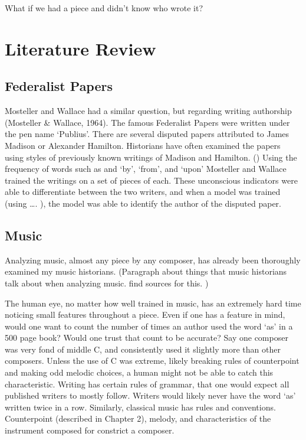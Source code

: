 \documentclass[12pt,twoside]{reedthesis}
\theoremstyle{definition}
\theoremstyle{definition}
\theoremstyle{definition}
\theoremstyle{remark}
\begin{document}
What if we had a piece and didn't know who wrote it?

\section{Literature Review}\label{literature-review}

\subsection{Federalist Papers}\label{federalist-papers}

Mosteller and Wallace had a similar question, but regarding writing
authorship (Mosteller \& Wallace, 1964). The famous Federalist Papers
were written under the pen name `Publius'. There are several disputed
papers attributed to James Madison or Alexander Hamilton. Historians
have often examined the papers using styles of previously known writings
of Madison and Hamilton. () Using the frequency of words such as and
`by', `from', and `upon' Mosteller and Wallace trained the writings on a
set of pieces of each. These unconscious indicators were able to
differentiate between the two writers, and when a model was trained
(using \ldots{}. ), the model was able to identify the author of the
disputed paper.

\subsection{Music}\label{music}

Analyzing music, almost any piece by any composer, has already been
thoroughly examined my music historians. (Paragraph about things that
music historians talk about when analyzing music. find sources for this.
)

The human eye, no matter how well trained in music, has an extremely
hard time noticing small features throughout a piece. Even if one has a
feature in mind, would one want to count the number of times an author
used the word `as' in a 500 page book? Would one trust that count to be
accurate? Say one composer was very fond of middle C, and consistently
used it slightly more than other composers. Unless the use of C was
extreme, likely breaking rules of counterpoint and making odd melodic
choices, a human might not be able to catch this characteristic. Writing
has certain rules of grammar, that one would expect all published
writers to mostly follow. Writers would likely never have the word `as'
written twice in a row. Similarly, classical music has rules and
conventions. Counterpoint (described in Chapter 2), melody, and
characteristics of the instrument composed for constrict a composer.
\end{document}
